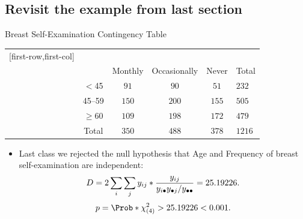 \documentclass{article}\usepackage[]{graphicx}\usepackage[svgnames]{xcolor}
\let\log\relax%
\begin{document}
\subsection*{Revisit the example from last section}
\begin{Example}{Breast Self-Examination Contingency Table}
    \begin{center}
        \begin{NiceTabular}{c|ccc|c}[first-row,first-col]
            &&\\
            && Monthly & Occasionally & Never & Total\\
            \midrule
             & $<$45 & $ 91 $ & $ 90 $ & $ 51 $ & $ 232 $\\
            & 45--59 & $ 150 $ & $ 200 $ & $ 155 $ & $ 505 $\\
            & $ \ge $60 & $ 109 $ & $ 198 $ & $ 172 $ & $ 479 $\\
            \midrule
            & Total & $ 350 $ & $ 488 $ & $ 378 $ & $ 1216 $
        \end{NiceTabular}
    \end{center}
\end{Example}
\begin{itemize}
    \item Last class we rejected the null hypothesis that Age and Frequency of breast
          self-examination are independent:
          \[ D=2\sum_i\sum_j y_{ij}\log*{\frac{y_{ij}}{y_{i\bullet}y_{\bullet j}/y_{\bullet\bullet}}}=25.19226. \]
          \[ p=\Prob*{\chi^2_{(4)}>25.19226}<0.001. \]
\end{itemize}
\end{document}
